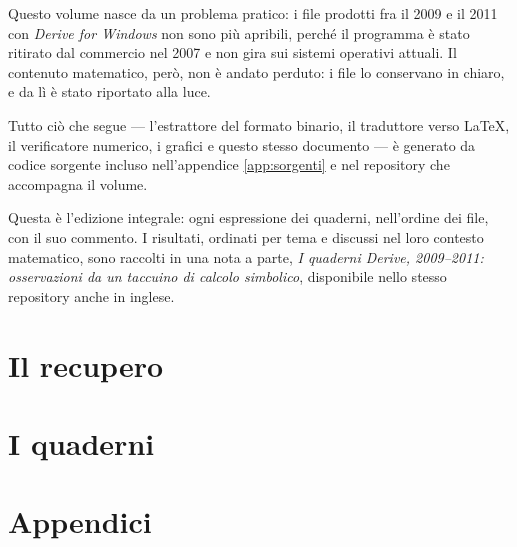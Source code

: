\documentclass[11pt,a4paper,openright]{book}
\begin{document}
\cleardoublepage
\thispagestyle{empty}
\vspace*{\fill}
\begin{center}
\begin{minipage}{0.78\linewidth}
\small\sffamily\color{grigiotesto}
Questo volume nasce da un problema pratico: i file prodotti fra il 2009
e il 2011 con \emph{Derive for Windows} non sono pi\`u apribili, perch\'e
il programma \`e stato ritirato dal commercio nel 2007 e non gira sui
sistemi operativi attuali. Il contenuto matematico, per\`o, non \`e andato
perduto: i file lo conservano in chiaro, e da l\`i \`e stato riportato alla
luce.

\vspace{10pt}
Tutto ci\`o che segue --- l'estrattore del formato binario, il traduttore
verso \LaTeX, il verificatore numerico, i grafici e questo stesso
documento --- \`e generato da codice sorgente incluso nell'appendice
\ref{app:sorgenti} e nel repository che accompagna il volume.

\vspace{10pt}
Questa \`e l'edizione integrale: ogni espressione dei quaderni, nell'ordine
dei file, con il suo commento. I risultati, ordinati per tema e discussi nel
loro contesto matematico, sono raccolti in una nota a parte, \emph{I
quaderni Derive, 2009--2011: osservazioni da un taccuino di calcolo
simbolico}, disponibile nello stesso repository anche in inglese.
\end{minipage}
\end{center}
\vspace*{\fill}

\cleardoublepage
\pagestyle{fancy}
\tableofcontents

\mainmatter

\part{Il recupero}


\part{I quaderni}


\appendix
\part{Appendici}

\end{document}
